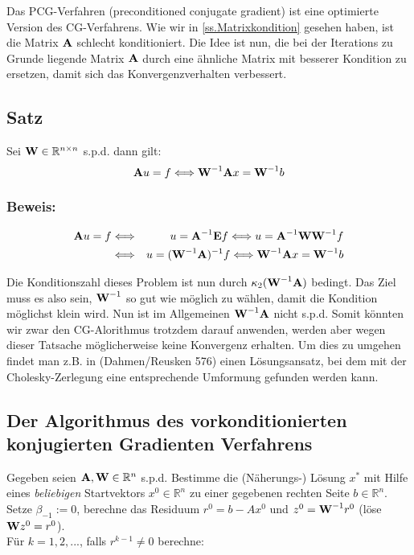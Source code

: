 Das PCG-Verfahren (preconditioned conjugate gradient) ist eine optimierte Version des CG-Verfahrens. Wie wir in \autoref{ss.Matrixkondition} gesehen haben, ist die Matrix ${\textbf{A}}$ schlecht konditioniert. Die Idee ist nun, die bei der Iterations zu Grunde liegende Matrix ${\textbf{A}}$ durch eine ähnliche Matrix mit besserer Kondition zu ersetzen, damit sich das Konvergenzverhalten verbessert.

\subsection{Satz}

Sei ${\textbf{W}} \in \mathbb{R}^{n \times n}$ s.p.d. dann gilt:
\begin{equation}
{\textbf{A}}u = f \Longleftrightarrow {\textbf{W}}^{-1} {\textbf{A}} x = {\textbf{W}}^{-1} b
\end{equation}

\subsubsection{Beweis:}

\begin{eqnarray}
{\textbf{A}}u = f &\Longleftrightarrow& u = {\textbf{A}}^{-1} {\textbf{E}} f \Longleftrightarrow u = {\textbf{A}}^{-1} {\textbf{W}} {\textbf{W}}^{-1} f \notag \\
&\Longleftrightarrow& u = ({\textbf{W}}^{-1} {\textbf{A}})^{-1} f \Longleftrightarrow {\textbf{W}}^{-1} {\textbf{A}} x = {\textbf{W}}^{-1} b \notag
\end{eqnarray}

Die Konditionszahl dieses Problem ist nun durch $\kappa_{2}({\textbf{W}}^{-1}{\textbf{A}})$ bedingt. Das Ziel muss es also sein, ${\textbf{W}}^{-1}$ so gut wie möglich zu wählen, damit die Kondition möglichst klein wird. Nun ist im Allgemeinen ${\textbf{W}}^{-1}{\textbf{A}}$ nicht s.p.d. Somit könnten wir zwar den CG-Alorithmus trotzdem darauf anwenden, werden aber wegen dieser Tatsache möglicherweise keine Konvergenz erhalten. Um dies zu umgehen findet man z.B. in (Dahmen/Reusken 576) einen Lösungsansatz, bei dem mit der Cholesky-Zerlegung eine entsprechende Umformung gefunden werden kann.

\subsection{Der Algorithmus des vorkonditionierten konjugierten Gradienten Verfahrens}

Gegeben seien ${\textbf{A}}, {\textbf{W}} \in \mathbb{R}^{n}$ s.p.d. Bestimme die (Näherungs-) Lösung $x^{*}$ mit Hilfe eines \textit{beliebigen} Startvektors $x^{0} \in \mathbb{R}^{n}$ zu einer gegebenen rechten Seite $b \in \mathbb{R}^{n}$. Setze $\beta_{-1} := 0$, berechne das Residuum $r^{0} = b - Ax^{0}$ und $z^{0} = {\textbf{W}}^{-1}r^{0}$ (löse ${\textbf{W}}z^{0} = r^{0}$).\\
Für $k = 1,2,...$, falls $r^{k-1} \ne 0$ berechne:

